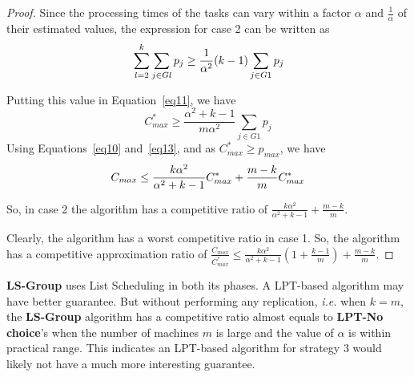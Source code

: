 \documentclass[twocolumn]{svjour3}
\begin{document}
\begin{proof}
  Since the processing times of the tasks can vary within a factor
  $\alpha$ and $\frac{1}{\alpha}$ of their estimated values, the
  expression for case 2 can be written as
  \begin{equation}{\nonumber}
    \sum_{l=2}^{k}\sum_{j \in Gl }^{}{ p_{j}} \geq \frac{1}{\alpha^2} (k-1)\sum_{j \in G1 }^{}{ p_{j}}
  \end{equation}
  
  Putting this value in Equation~\ref{eq11}, we have
  \begin{equation}\label{eq13}
    C_{max}^{*} \geq \frac{\alpha^2+k-1}{m\alpha^2}\sum_{j \in G1 }^{}{ p_{j}}
  \end{equation}
  Using Equations~\ref{eq10} and~\ref{eq13}, and as $C_{max}^{*} \geq p_{max}$, we have
  \begin{equation}{\nonumber}
    C_{max} \leq \frac{k\alpha^2}{\alpha^2+k-1}C_{max}^{*}+\frac{m-k}{m}C_{max}^{*}
  \end{equation}
  
  So, in case 2 the algorithm has a competitive ratio of
  $\frac{k\alpha^2}{\alpha^2+k-1}+\frac{m-k}{m}$.

  Clearly, the algorithm has a worst competitive ratio in case 1.  So,
  the algorithm has a competitive approximation ratio of
  $\frac{C_{max}}{C_{max}^{*}} \leq \frac{k\alpha^{2}}{\alpha^{2}+k-1}
  \left( 1+ {\frac{k-1}{m}} \right) + {\frac{m-k}{m}}$.
\end{proof}


\textbf{LS-Group} uses List Scheduling in both its phases. A LPT-based
algorithm may have better guarantee. But without performing any
replication, {\em i.e.} when $k=m$, the \textbf{LS-Group} algorithm
has a competitive ratio almost equals to \textbf{LPT-No choice}'s when
the number of machines $m$ is large and the value of $\alpha$ is
within practical range. This indicates an LPT-based algorithm for
strategy 3 would likely not have a much more interesting guarantee.
\end{document}
